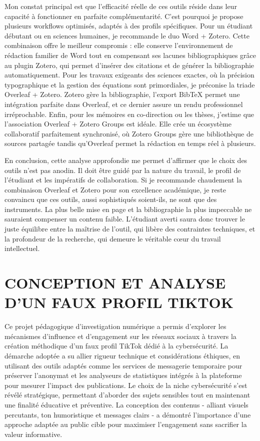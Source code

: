 \documentclass[12pt, a4paper]{article}
\begin{document}
		Mon constat principal est que l'efficacité réelle de ces outils réside dans leur capacité à fonctionner en parfaite complémentarité. C'est pourquoi je propose plusieurs workflows optimisés, adaptés à des profils spécifiques. Pour un étudiant débutant ou en sciences humaines, je recommande le duo Word + Zotero. Cette combinaison offre le meilleur compromis : elle conserve l'environnement de rédaction familier de Word tout en compensant ses lacunes bibliographiques grâce au plugin Zotero, qui permet d'insérer des citations et de générer la bibliographie automatiquement. Pour les travaux exigeants des sciences exactes, où la précision typographique et la gestion des équations sont primordiales, je préconise la triade Overleaf + Zotero. Zotero gère la bibliographie, l'export BibTeX permet une intégration parfaite dans Overleaf, et ce dernier assure un rendu professionnel irréprochable. Enfin, pour les mémoires en co-direction ou les thèses, j'estime que l'association Overleaf + Zotero Groups est idéale. Elle crée un écosystème collaboratif parfaitement synchronisé, où Zotero Groups gère une bibliothèque de sources partagée tandis qu'Overleaf permet la rédaction en temps réel à plusieurs.
		
		En conclusion, cette analyse approfondie me permet d'affirmer que le choix des outils n'est pas anodin. Il doit être guidé par la nature du travail, le profil de l'étudiant et les impératifs de collaboration. Si je recommande chaudement la combinaison Overleaf et Zotero pour son excellence académique, je reste convaincu que ces outils, aussi sophistiqués soient-ils, ne sont que des instruments. La plus belle mise en page et la bibliographie la plus impeccable ne sauraient compenser un contenu faible. L'étudiant averti saura donc trouver le juste équilibre entre la maîtrise de l'outil, qui libère des contraintes techniques, et la profondeur de la recherche, qui demeure le véritable cœur du travail intellectuel.
		
		\section{CONCEPTION ET ANALYSE D'UN FAUX PROFIL TIKTOK}
		
		Ce projet pédagogique d'investigation numérique a permis d'explorer les mécanismes d'influence et d'engagement sur les réseaux sociaux à travers la création méthodique d'un faux profil TikTok dédié à la cybersécurité. La démarche adoptée a su allier rigueur technique et considérations éthiques, en utilisant des outils adaptés comme les services de messagerie temporaire pour préserver l'anonymat et les analyseurs de statistiques intégrés à la plateforme pour mesurer l'impact des publications. Le choix de la niche cybersécurité s'est révélé stratégique, permettant d'aborder des sujets sensibles tout en maintenant une finalité éducative et préventive. La conception des contenus - alliant visuels percutants, ton humoristique et messages clairs - a démontré l'importance d'une approche adaptée au public cible pour maximiser l'engagement sans sacrifier la valeur informative.
		
\end{document}
